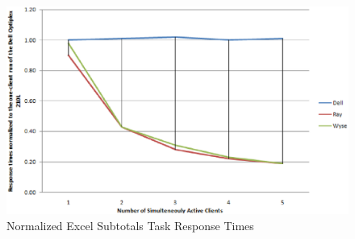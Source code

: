                 \begin{figure}[h!tb]
                    \centering
                    \includegraphics[scale=0.5]{graphics/graphic_excel_test}
                    \caption{Normalized Excel Subtotals Task Response Times}
                    \label{fig:graphic_excel_test}
                \end{figure}
